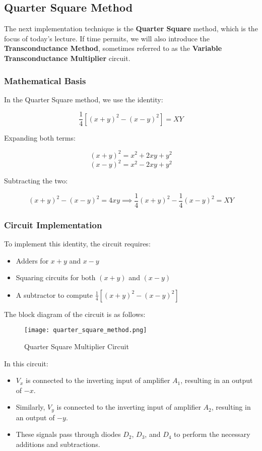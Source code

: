 \subsection{Quarter Square Method}

The next implementation technique is the \textbf{Quarter Square} method, which is the focus of today's lecture. If time permits, we will also introduce the \textbf{Transconductance Method}, sometimes referred to as the \textbf{Variable Transconductance Multiplier} circuit.

\subsubsection{Mathematical Basis}

In the Quarter Square method, we use the identity:

\[
\frac{1}{4}[(x + y)^2 - (x - y)^2] = XY
\]

Expanding both terms:

\[
(x + y)^2 = x^2 + 2xy + y^2
\]
\[
(x - y)^2 = x^2 - 2xy + y^2
\]

Subtracting the two:

\[
(x + y)^2 - (x - y)^2 = 4xy \implies \frac{1}{4}(x + y)^2 - \frac{1}{4}(x - y)^2 = XY
\]

\subsubsection{Circuit Implementation}

To implement this identity, the circuit requires:

\begin{itemize}
    \item Adders for \( x + y \) and \( x - y \)
    \item Squaring circuits for both \( (x + y) \) and \( (x - y) \)
    \item A subtractor to compute \( \frac{1}{4}[(x + y)^2 - (x - y)^2] \)
\end{itemize}

The block diagram of the circuit is as follows:

\begin{figure}[h]
    \centering
    \texttt{[image: quarter\_square\_method.png]}
    \caption{Quarter Square Multiplier Circuit}
    \label{fig:quarter_square}
\end{figure}

In this circuit:

\begin{itemize}
    \item \( V_x \) is connected to the inverting input of amplifier \( A_1 \), resulting in an output of \( -x \).
    \item Similarly, \( V_y \) is connected to the inverting input of amplifier \( A_2 \), resulting in an output of \( -y \).
    \item These signals pass through diodes \( D_2 \), \( D_3 \), and \( D_4 \) to perform the necessary additions and subtractions.
\end{itemize}

